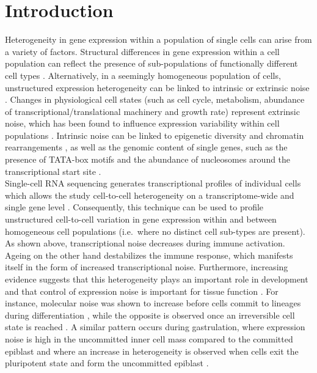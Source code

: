 
\section{Introduction}

Heterogeneity in gene expression within a population of single cells can arise from a variety of factors. Structural differences in gene expression within a cell population can reflect the presence of sub-populations of functionally different cell types \citep{Zeisel2015, Paul2015}. Alternatively, in a seemingly homogeneous population of cells,  unstructured expression heterogeneity can be linked to intrinsic or extrinsic noise \citep{Elowitz2002}. Changes in physiological cell states (such as cell cycle, metabolism, abundance of transcriptional/translational machinery and growth rate) represent extrinsic noise, which has been found to influence expression variability within cell populations \citep{Keren2015, Buettner2015, Zeng2017}. Intrinsic noise can be linked to epigenetic diversity \citep{Smallwood2014} and chromatin rearrangements \citep{Buenrostro2015}, as well as the genomic content of single genes, such as the presence of TATA-box motifs and the abundance of nucleosomes around the transcriptional start site \citep{Hornung2012}.  \\ 

Single-cell RNA sequencing generates transcriptional profiles of individual cells which allows the study cell-to-cell heterogeneity on a transcriptome-wide \citep{Grun2014} and single gene level \citep{Goolam2016}. Consequently, this technique can be used to profile unstructured cell-to-cell variation in gene expression within and between homogeneous cell populations (i.e.~where no distinct cell sub-types are present). As shown above, transcriptional noise decreases during immune activation. Ageing on the other hand destabilizes the immune response, which manifests itself in the form of increased transcriptional noise. Furthermore, increasing evidence suggests that this heterogeneity plays an important role in development \citep{Chang2008} and that control of expression noise is important for tissue function \citep{BaharHalpern2015}. For instance, molecular noise was shown to increase before cells commit to lineages during differentiation \citep{Mojtahedi2016}, while the opposite is observed once an irreversible cell state is reached \citep{Richard2016}. A similar pattern occurs during gastrulation, where expression noise is high in the uncommitted inner cell mass compared to the committed epiblast and where an increase in heterogeneity is observed when cells exit the pluripotent state and form the uncommitted epiblast \citep{Mohammed2017}. \\

